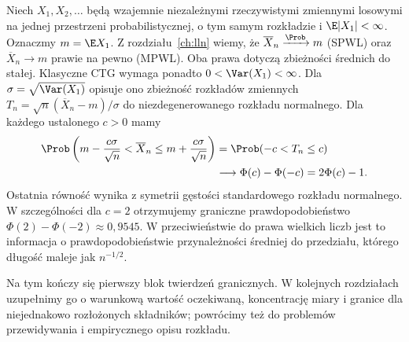 Niech $X_1,X_2,\ldots$ będą wzajemnie niezależnymi
rzeczywistymi zmiennymi losowymi na jednej przestrzeni
probabilistycznej, o tym samym rozkładzie i
$\E|X_1|<\infty$. Oznaczmy $m=\E X_1$.
Z rozdziału~\ref{ch:lln} wiemy, że
$\overline X_n\xrightarrow{\Prob}m$ (SPWL) oraz
$\overline X_n\to m$ prawie na pewno (MPWL).
Oba prawa dotyczą zbieżności średnich do stałej.
Klasyczne CTG wymaga ponadto $0<\Var(X_1)<\infty$.
Dla $\sigma=\sqrt{\Var(X_1)}$ opisuje ono zbieżność
rozkładów zmiennych
$T_n=\sqrt n(\overline X_n-m)/\sigma$
do niezdegenerowanego rozkładu normalnego.
Dla każdego ustalonego $c>0$ mamy
\[
\begin{aligned}
\Prob\left(m-\frac{c\sigma}{\sqrt n}<\overline X_n
\leq m+\frac{c\sigma}{\sqrt n}\right)
&=\Prob(-c<T_n\leq c)\\
&\longrightarrow\Phi(c)-\Phi(-c)=2\Phi(c)-1.
\end{aligned}
\]
Ostatnia równość wynika z symetrii gęstości
standardowego rozkładu normalnego.
W szczególności dla $c=2$ otrzymujemy graniczne
prawdopodobieństwo $\Phi(2)-\Phi(-2)\approx0{,}9545$.
W przeciwieństwie do prawa wielkich liczb jest to
informacja o prawdopodobieństwie przynależności średniej
do przedziału, którego długość maleje jak $n^{-1/2}$.

Na tym kończy się pierwszy blok twierdzeń granicznych.
W kolejnych rozdziałach uzupełnimy go o warunkową wartość
oczekiwaną, koncentrację miary i granice dla
niejednakowo rozłożonych składników; powrócimy też
do problemów przewidywania i empirycznego opisu rozkładu.

